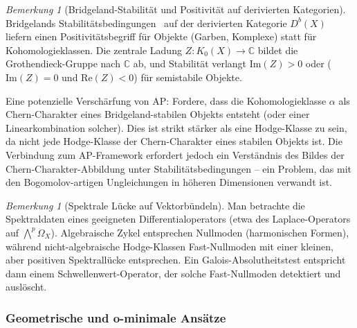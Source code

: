 \documentclass[aps,prd,twocolumn,superscriptaddress,nofootinbib]{revtex4-2}
\theoremstyle{definition}
\theoremstyle{remark}
\newtheorem{remark}[theorem]{Bemerkung}
\begin{document}
\begin{remark}[Bridgeland-Stabilität und Positivität auf derivierten Kategorien]
\label{rem:bridgeland}
Bridgelands Stabilitätsbedingungen~\cite{Bridgeland2007} auf der derivierten Kategorie $D^b(X)$ liefern einen Positivitätsbegriff für Objekte (Garben, Komplexe) statt für Kohomologieklassen. Die zentrale Ladung $Z: K_0(X) \to \mathbb{C}$ bildet die Grothendieck-Gruppe nach $\mathbb{C}$ ab, und Stabilität verlangt $\mathrm{Im}(Z) > 0$ oder ($\mathrm{Im}(Z) = 0$ und $\mathrm{Re}(Z) < 0$) für semistabile Objekte.

Eine potenzielle Verschärfung von AP: Fordere, dass die Kohomologieklasse $\alpha$ als Chern-Charakter eines Bridgeland-stabilen Objekts entsteht (oder einer Linearkombination solcher). Dies ist strikt stärker als eine Hodge-Klasse zu sein, da nicht jede Hodge-Klasse der Chern-Charakter eines stabilen Objekts ist. Die Verbindung zum AP-Framework erfordert jedoch ein Verständnis des Bildes der Chern-Charakter-Abbildung unter Stabilitätsbedingungen -- ein Problem, das mit den Bogomolov-artigen Ungleichungen in höheren Dimensionen verwandt ist.
\end{remark}

\begin{remark}[Spektrale Lücke auf Vektorbündeln]
\label{rem:spectral-gap}
Man betrachte die \glqq Spektraldaten\grqq{} eines geeigneten Differentialoperators (etwa des Laplace-Operators auf $\bigwedge^p \Omega_X$). Algebraische Zykel entsprechen Nullmoden (harmonischen Formen), während nicht-algebraische Hodge-Klassen \glqq Fast-Nullmoden\grqq{} mit einer kleinen, aber positiven Spektrallücke entsprechen. Ein Galois-Absolutheitstest entspricht dann einem Schwellenwert-Operator, der solche Fast-Nullmoden detektiert und auslöscht.
\end{remark}

\subsubsection{Geometrische und o-minimale Ansätze}
\end{document}
